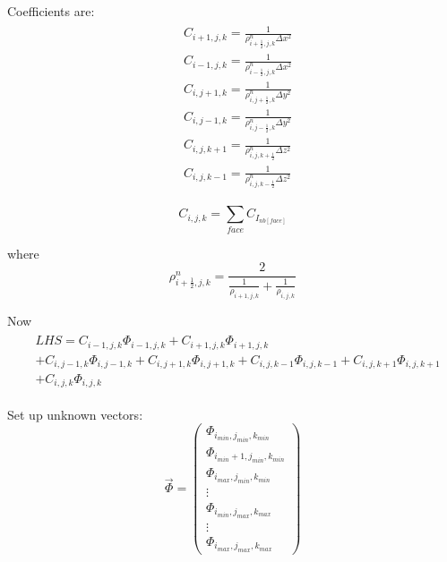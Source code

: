 \documentclass{article}
\numberwithin{equation}{subsection}
\begin{document}
Coefficients are:
\begin{align}
\begin{split}
& C_{i+1,j,k} = \frac{1}{\rho^n_{i+\frac{1}{2},j,k} \Delta x^2} \\
& C_{i-1,j,k} = \frac{1}{\rho^n_{i-\frac{1}{2},j,k} \Delta x^2} \\
& C_{i,j+1,k} = \frac{1}{\rho^n_{i,j+\frac{1}{2},k} \Delta y^2} \\
& C_{i,j-1,k} = \frac{1}{\rho^n_{i,j-\frac{1}{2},k} \Delta y^2} \\
& C_{i,j,k+1} = \frac{1}{\rho^n_{i,j,k+\frac{1}{2}} \Delta z^2} \\
& C_{i,j,k-1} = \frac{1}{\rho^n_{i,j,k-\frac{1}{2}} \Delta z^2}
\end{split}
\end{align}

\begin{equation}
C_{i,j,k} = \sum_{face} C_{I_{nb[face]}}
\end{equation}



where
\begin{equation}
\rho^n_{i+\frac{1}{2},j,k} = \frac{2}{\frac{1}{\rho_{i+1,j,k}} + \frac{1}{\rho_{i,j,k}}}
\end{equation}


Now
\begin{align}
\begin{split}
& LHS =  C_{i-1,j,k} \Phi_{i-1,j,k}  + C_{i+1,j,k}\Phi_{i+1,j,k} \\
& + C_{i,j-1,k}\Phi_{i,j-1,k} + C_{i,j+1,k}\Phi_{i,j+1,k} + C_{i,j,k-1}\Phi_{i,j,k-1} + C_{i,j,k+1}\Phi_{i,j,k+1} \\
& + C_{i,j,k}\Phi_{i,j,k}
\end{split}
\end{align}

Set up unknown vectors:
\begin{equation}
\vec{\Phi} =
\begin{pmatrix}
\Phi_{i_{min},j_{min},k_{min}}\\ \Phi_{i_{min}+1,j_{min},k_{min}}\\ \Phi_{i_{max},j_{min},k_{min}} \\\vdots \\ \Phi_{i_{min},j_{max},k_{max}} \\\vdots \\ \Phi_{i_{max},j_{max},k_{max}}
\end{pmatrix}
\end{equation}
\end{document}
